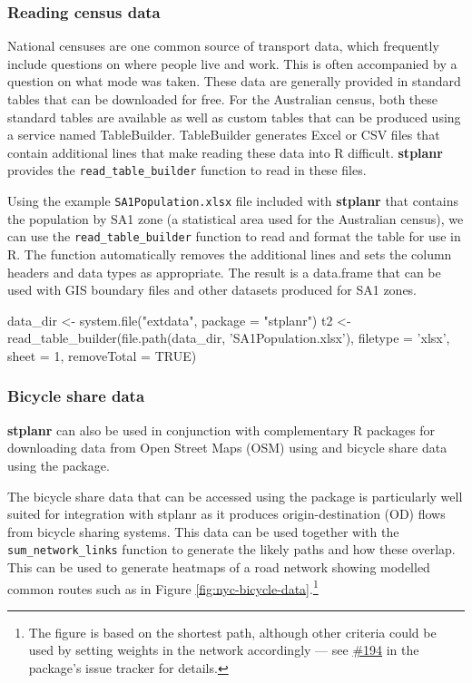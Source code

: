 \subsubsection{Reading census data} \label{reading-census-data}

National censuses are one common source of transport data, which frequently include questions on where people live and work.
This is often accompanied by a question on what mode was taken.
These data are generally provided in standard tables that can be downloaded for free.
For the Australian census, both these standard tables are available as well as custom tables that can be produced using a service named TableBuilder.
TableBuilder generates Excel or CSV files that contain additional lines that make reading these data into R difficult.
\textbf{stplanr} provides the \texttt{read\_table\_builder} function to read in these files.

Using the example \texttt{SA1Population.xlsx} file included with \textbf{stplanr} that contains the population by SA1 zone (a statistical area used for the Australian census), we can use the \texttt{read\_table\_builder} function to read and format the table for use in R.
The function automatically removes the additional lines and sets the column headers and data types as appropriate.
The result is a data.frame that can be used with GIS boundary files and other datasets produced for SA1 zones.

\begin{Schunk}
\begin{Sinput}
data_dir <- system.file("extdata", package = "stplanr")
t2 <- read_table_builder(file.path(data_dir, 'SA1Population.xlsx'),
                         filetype = 'xlsx', sheet = 1, removeTotal = TRUE)
\end{Sinput}
\end{Schunk}

\subsubsection{Bicycle share data} \label{bicycle-share-data}
\textbf{stplanr} can also be used in conjunction with complementary R packages for downloading data from Open Street Maps (OSM) using  and bicycle share data using the  package.

The bicycle share data that can be accessed using the  package is particularly well suited for integration with stplanr as it produces origin-destination (OD) flows from bicycle sharing systems.
This data can be used together with the \texttt{sum\_network\_links} function to generate the likely paths and how these overlap.
This can be used to generate heatmaps of a road network showing modelled common routes such as in Figure
\ref{fig:nyc-bicycle-data}.\footnote{The
figure is based on the shortest path, although other criteria could be used by setting weights in the network accordingly --- see \href{https://github.com/ropensci/stplanr/issues/194}{\#194} in the package's issue tracker for
details.}

